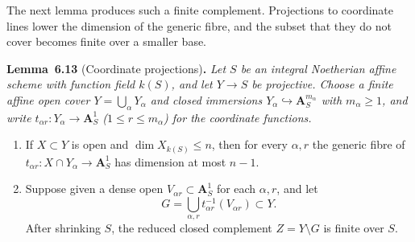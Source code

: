 \documentclass[11pt]{article}
\newenvironment{bpstatement}[2]{\par\addvspace{0.6\baselineskip}\noindent\textbf{#1}#2\textbf{.}\enspace\ignorespaces}
  {\par\addvspace{0.4\baselineskip}}
\newenvironment{bpstatementit}[2]{\begin{bpstatement}{#1}{#2}\itshape\ignorespaces}{\end{bpstatement}}
\begin{document}
\label{bp552}%
The next lemma produces such a finite complement. Projections to coordinate lines lower the dimension of the generic fibre, and the subset that they do not cover becomes finite over a smaller base.

\label{bp553}%
\begin{bpstatementit}{Lemma~6.13}{ (Coordinate projections)}
Let \(S\) be an integral Noetherian affine scheme with function field \(k(S)\), and let \(Y\to S\) be projective. Choose a finite affine open cover \(Y=\bigcup_\alpha Y_\alpha\) and closed immersions \(Y_\alpha\hookrightarrow\mathbf A^{m_\alpha}_S\) with \(m_\alpha\geq1\), and write \(t_{\alpha r}:Y_\alpha\to\mathbf A^1_S\) (\(1\le r\le m_\alpha\)) for the coordinate functions.

\begin{enumerate}
\item If \(X\subset Y\) is open and \(\dim X_{k(S)}\leq n\), then for every \(\alpha,r\) the generic fibre of \(t_{\alpha r}:X\cap Y_\alpha\to\mathbf A^1_S\) has dimension at most \(n-1\).
\item Suppose given a dense open \(V_{\alpha r}\subset\mathbf A^1_S\) for each \(\alpha,r\), and let \[
   G=\bigcup_{\alpha,r}
   t_{\alpha r}^{-1}(V_{\alpha r})\subset Y.
   \] After shrinking \(S\), the reduced closed complement \(Z=Y\setminus G\) is finite over \(S\).
\end{enumerate}
\end{bpstatementit}
\end{document}
